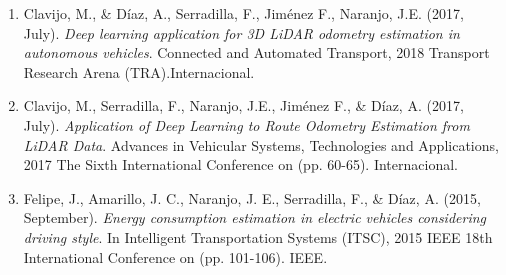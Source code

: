 \begin{enumerate}
	\item Clavijo, M., \& Díaz, A., Serradilla, F., Jiménez F., Naranjo, J.E. (2017, July). \textit{Deep learning application for 3D LiDAR odometry estimation in autonomous vehicles}. Connected and Automated Transport, 2018 Transport Research Arena (TRA).Internacional.
	\item Clavijo, M., Serradilla, F., Naranjo, J.E., Jiménez F., \& Díaz, A. (2017, July). \textit{Application of Deep Learning to Route Odometry Estimation from LiDAR Data}. Advances in Vehicular Systems, Technologies and Applications, 2017 The Sixth International Conference on (pp. 60-65). Internacional.
	\item Felipe, J., Amarillo, J. C., Naranjo, J. E., Serradilla, F., \& Díaz, A. (2015, September). \textit{Energy consumption estimation in electric vehicles considering driving style}. In Intelligent Transportation Systems (ITSC), 2015 IEEE 18th International Conference on (pp. 101-106). IEEE.
\end{enumerate}